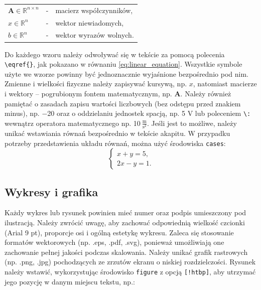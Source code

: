 \vspace*{0.5em}
\begin{tabular}{@{}lll}
$\mathbf{A} \in \mathbb{R}^{n\times n}$ &- &macierz współczynników,\\
$x \in \mathbb{R}^{n}$         &-&wektor niewiadomych,\\
$b \in \mathbb{R}^{n}$         &-&wektor wyrazów wolnych.
\end{tabular}
\vspace*{0.5em}

\noindent Do każdego wzoru należy odwoływać się w tekście za pomocą polecenia \verb|\eqref{}|, jak pokazano w równaniu \eqref{eq:linear_equation}. Wszystkie symbole użyte we wzorze powinny być jednoznacznie wyjaśnione bezpośrednio pod nim. Zmienne i wielkości fizyczne należy zapisywać kursywą, np. $x$, natomiast macierze i wektory – pogrubionym fontem matematycznym, np. $\mathbf{A}$. Należy również pamiętać o zasadach zapisu wartości liczbowych (bez odstępu przed znakiem minus), np. $-$20 oraz o oddzielaniu jednostek spacją, np. 5 V lub poleceniem \verb|\:| wewnątrz operatora matematycznego np. 10$\: \frac{\mathrm{m}}{\mathrm{s^2}}$. Jeśli jest to możliwe, należy unikać wstawiania równań bezpośrednio w tekście akapitu. W przypadku potrzeby przedstawienia układu równań, można użyć środowiska \verb|cases|:
\begin{equation}
\begin{cases}
x + y = 5,\\
2x - y = 1.
\end{cases}
\label{eq:uklad}
\end{equation}
\enlargethispage{\baselineskip}

\subsection{Wykresy i grafika}
Każdy wykres lub rysunek powinien mieć numer oraz podpis umieszczony pod ilustracją. Należy zwrócić uwagę, aby zachować odpowiednią wielkość czcionki (Arial 9 pt), proporcje osi i ogólną estetykę wykresu. Zaleca się stosowanie formatów wektorowych (np. .eps, .pdf, .svg), ponieważ umożliwiają one zachowanie pełnej jakości podczas skalowania. Należy unikać grafik rastrowych (np. .png, .jpg) pochodzących ze zrzutów ekranu o niskiej rozdzielczości. Rysunek należy wstawić, wykorzystując środowisko \verb|figure| z opcją \verb|[!htbp]|, aby utrzymać jego pozycję w danym miejscu tekstu, np.:

